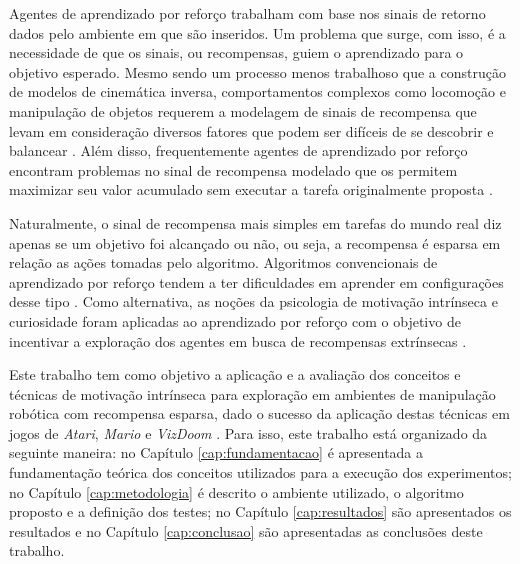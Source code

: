 Agentes de aprendizado por reforço trabalham com base nos sinais de retorno dados pelo ambiente em que são inseridos. Um problema que surge, com isso, é a necessidade de que os sinais, ou recompensas, guiem o aprendizado para o objetivo esperado. Mesmo sendo um processo menos trabalhoso que a construção de modelos de cinemática inversa, comportamentos complexos como locomoção e manipulação de objetos requerem a modelagem de sinais de recompensa que levam em consideração diversos fatores que podem ser difíceis de se descobrir e balancear \cite{dexterity, ng, deepLoco}. Além disso, frequentemente agentes de aprendizado por reforço encontram problemas no sinal de recompensa modelado que os permitem maximizar seu valor acumulado sem executar a tarefa originalmente proposta \cite{rewardhacking, rewardfaulty}.

Naturalmente, o sinal de recompensa mais simples em tarefas do mundo real diz apenas se um objetivo foi alcançado ou não, ou seja, a recompensa é esparsa em relação as ações tomadas pelo algoritmo. Algoritmos convencionais de aprendizado por reforço tendem a ter dificuldades em aprender em configurações desse tipo \cite{hindsight}. Como alternativa, as noções da psicologia de motivação intrínseca \cite{intrinsicryan} e curiosidade \cite{CuriosityandMotivation} foram aplicadas ao aprendizado por reforço com o objetivo de incentivar a exploração dos agentes em busca de recompensas extrínsecas \cite{curiositylarge, pathak}.

Este trabalho tem como objetivo a aplicação e a avaliação dos conceitos e técnicas de motivação intrínseca para exploração em ambientes de manipulação robótica com recompensa esparsa, dado o sucesso da aplicação destas técnicas em jogos de \textit{Atari}, \textit{Mario} e \textit{VizDoom} \cite{curiositylarge, pathak}. Para isso, este trabalho está organizado da seguinte maneira: no Capítulo \ref{cap:fundamentacao} é apresentada a fundamentação teórica dos conceitos utilizados para a execução dos experimentos; no Capítulo \ref{cap:metodologia} é descrito o ambiente utilizado, o algoritmo proposto e a definição dos testes; no Capítulo \ref{cap:resultados} são apresentados os resultados e no Capítulo \ref{cap:conclusao} são apresentadas as conclusões deste trabalho.